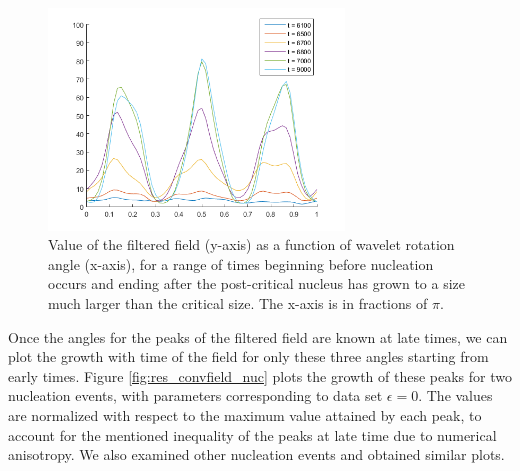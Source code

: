  \begin{figure}[h]
	\centering
	\includegraphics[width=0.7\textwidth]{fig_res/convField_byAngle}
	\caption{Value of the filtered field (y-axis) as a function of wavelet rotation angle (x-axis), for a range of times beginning before nucleation occurs and ending after the post-critical nucleus has grown to a size much larger than the critical size. The x-axis is in fractions of $\pi$.}\label{fig:res_wavelet_fieldvalues}
\end{figure}

Once the angles for the peaks of the filtered field are known at late times, we can plot the growth with time of the field for only these three angles starting from early times. Figure \ref{fig:res_convfield_nuc} plots the growth of these peaks for two nucleation events, with parameters corresponding to data set $\epsilon=0$. The values are normalized with respect to the maximum value attained by each peak, to account for the mentioned inequality of the peaks at late time due to numerical anisotropy. We also examined other nucleation events and obtained similar plots.


